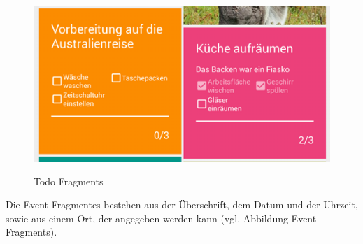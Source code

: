 \begin{figure}[H]
\centering
\begin{minipage}[t]{1\textwidth} %
\caption{Todo Fragments} %
\includegraphics[width=1\textwidth]{img/FragmentT}\\ %
\end{minipage}
\end{figure}

Die Event Fragmentes bestehen aus der Überschrift, dem Datum und der Uhrzeit, sowie aus einem Ort, der angegeben werden kann (vgl. Abbildung Event Fragments).

